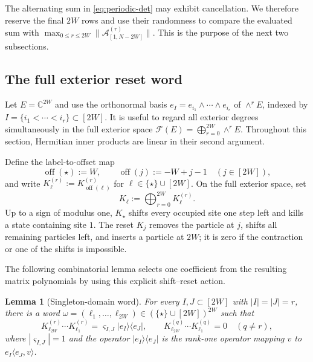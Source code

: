 \documentclass[11pt,reqno]{amsart}
\numberwithin{equation}{section}
\newtheorem{lemma}[theorem]{Lemma}
\theoremstyle{definition}
\theoremstyle{remark}
\newcommand{\C}{\mathbb C}
\newcommand{\1}{\mathbf 1}
\begin{document}
The alternating sum in \eqref{eq:periodic-det} may exhibit cancellation.
We therefore reserve the final $2W$ rows and use their randomness to compare
the evaluated sum with
$\max_{0\le r\le2W}\|\mathcal A_{[1,N-2W]}^{(r)}\|$.
This is the purpose of the next two subsections.

\subsection{The full exterior reset word}
\label{sec:reset}

Let $E=\C^{2W}$ and use the orthonormal basis
$e_I=e_{i_1}\wedge\cdots\wedge e_{i_r}$ of $\wedge^rE$, indexed by
$I=\{i_1<\cdots<i_r\}\subset[2W]$.  It is useful to regard all exterior
degrees simultaneously in the full exterior space
$\mathscr F(E)=\bigoplus_{r=0}^{2W}\wedge^rE$.
Throughout this section, Hermitian inner products are linear in their second
argument.

Define the label-to-offset map
\[
 \operatorname{off}(\star):=W,\qquad
 \operatorname{off}(j):=-W+j-1\quad(j\in[2W]),
\]
and write $K_\ell^{(r)}:=K_{\operatorname{off}(\ell)}^{(r)}$ for
$\ell\in\{\star\}\cup[2W]$.  On the full exterior space, set
\[
 K_\ell:=\bigoplus_{r=0}^{2W}K_\ell^{(r)}.
\]
Up to a sign of modulus one,
$K_\star$ shifts every occupied site one step left and kills a state
containing site $1$.  The reset $K_j$ removes the particle at $j$, shifts
all remaining particles left, and inserts a particle at $2W$; it is zero if
the contraction or one of the shifts is impossible.

The following combinatorial lemma selects one coefficient from the resulting
matrix polynomials by using this explicit shift--reset action.
\begin{lemma}[Singleton-domain word]\label{lem:singleton-word}
For every $I,J\subset[2W]$ with $|I|=|J|=r$, there is a word
$\omega=(\ell_1,\ldots,\ell_{2W})
\in(\{\star\}\cup[2W])^{2W}$ such that
\begin{equation}\label{eq:singleton-word}
 K_{\ell_{2W}}^{(r)}\cdots K_{\ell_1}^{(r)}
 =\varsigma_{I,J}|e_I\rangle\langle e_J|,\qquad
 K_{\ell_{2W}}^{(q)}\cdots K_{\ell_1}^{(q)}=0\quad(q\ne r),
\end{equation}
where $|\varsigma_{I,J}|=1$ and the operator $|e_I\rangle\langle e_J|$ is the rank-one operator mapping $v$ to $e_I\langle e_J,v\rangle$.
\end{lemma}
\end{document}
